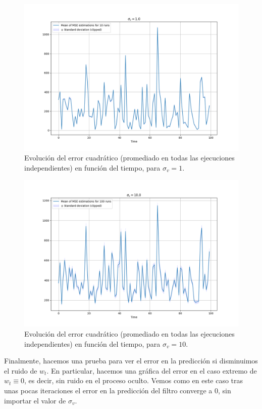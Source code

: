 \documentclass[11pt,a4paper]{article}
\begin{document}
\begin{figure}[h!]
    \centering
    \includegraphics[width=.95\textwidth]{img/error_s1}
    \caption{Evolución del error cuadrático (promediado en todas las ejecuciones independientes) en función del tiempo, para $\sigma_v=1$.}
    \label{fig:error1}
\end{figure}

\begin{figure}[h!]
    \centering
    \includegraphics[width=.95\textwidth]{img/error_s10}
    \caption{Evolución del error cuadrático (promediado en todas las ejecuciones independientes) en función del tiempo, para $\sigma_v=10$.}
    \label{fig:error2}
\end{figure}

\newpage

Finalmente, hacemos una prueba para ver el error en la predicción si disminuimos el ruido de $w_t$. En particular, hacemos una gráfica del error en el caso extremo de $w_t \equiv 0$, es decir, sin ruido en el proceso oculto. Vemos como en este caso tras unas pocas iteraciones el error en la predicción del filtro converge a $0$, sin importar el valor de $\sigma_v$.
\end{document}
